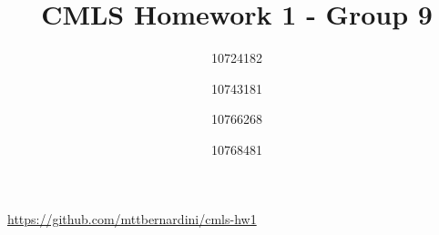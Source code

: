 \documentclass[a4paper,11pt]{article}
\title{CMLS Homework 1 - Group 9}
\author{10724182 \and 10743181 \and 10766268 \and 10768481}
\date{}
\begin{document}
	\maketitle
	{\footnotesize\hfill\url{https://github.com/mttbernardini/cmls-hw1}}

	
	\newpage
	
	
\end{document}
